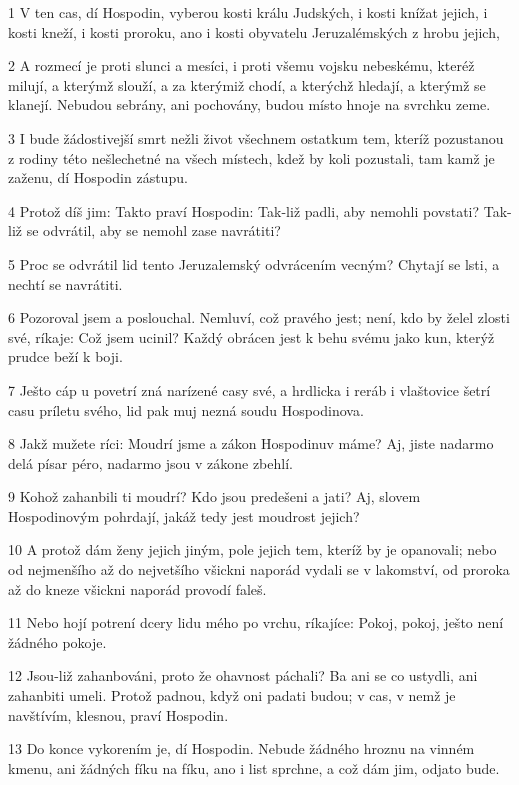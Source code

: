 \par 1 V ten cas, dí Hospodin, vyberou kosti králu Judských, i kosti knížat jejich, i kosti kneží, i kosti proroku, ano i kosti obyvatelu Jeruzalémských z hrobu jejich,
\par 2 A rozmecí je proti slunci a mesíci, i proti všemu vojsku nebeskému, kteréž milují, a kterýmž slouží, a za kterýmiž chodí, a kterýchž hledají, a kterýmž se klanejí. Nebudou sebrány, ani pochovány, budou místo hnoje na svrchku zeme.
\par 3 I bude žádostivejší smrt nežli život všechnem ostatkum tem, kteríž pozustanou z rodiny této nešlechetné na všech místech, kdež by koli pozustali, tam kamž je zaženu, dí Hospodin zástupu.
\par 4 Protož díš jim: Takto praví Hospodin: Tak-liž padli, aby nemohli povstati? Tak-liž se odvrátil, aby se nemohl zase navrátiti?
\par 5 Proc se odvrátil lid tento Jeruzalemský odvrácením vecným? Chytají se lsti, a nechtí se navrátiti.
\par 6 Pozoroval jsem a poslouchal. Nemluví, což pravého jest; není, kdo by želel zlosti své, ríkaje: Což jsem ucinil? Každý obrácen jest k behu svému jako kun, kterýž prudce beží k boji.
\par 7 Ješto cáp u povetrí zná narízené casy své, a hrdlicka i reráb i vlaštovice šetrí casu príletu svého, lid pak muj nezná soudu Hospodinova.
\par 8 Jakž mužete ríci: Moudrí jsme a zákon Hospodinuv máme? Aj, jiste nadarmo delá písar péro, nadarmo jsou v zákone zbehlí.
\par 9 Kohož zahanbili ti moudrí? Kdo jsou predešeni a jati? Aj, slovem Hospodinovým pohrdají, jakáž tedy jest moudrost jejich?
\par 10 A protož dám ženy jejich jiným, pole jejich tem, kteríž by je opanovali; nebo od nejmenšího až do nejvetšího všickni naporád vydali se v lakomství, od proroka až do kneze všickni naporád provodí faleš.
\par 11 Nebo hojí potrení dcery lidu mého po vrchu, ríkajíce: Pokoj, pokoj, ješto není žádného pokoje.
\par 12 Jsou-liž zahanbováni, proto že ohavnost páchali? Ba ani se co ustydli, ani zahanbiti umeli. Protož padnou, když oni padati budou; v cas, v nemž je navštívím, klesnou, praví Hospodin.
\par 13 Do konce vykorením je, dí Hospodin. Nebude žádného hroznu na vinném kmenu, ani žádných fíku na fíku, ano i list sprchne, a což dám jim, odjato bude.
